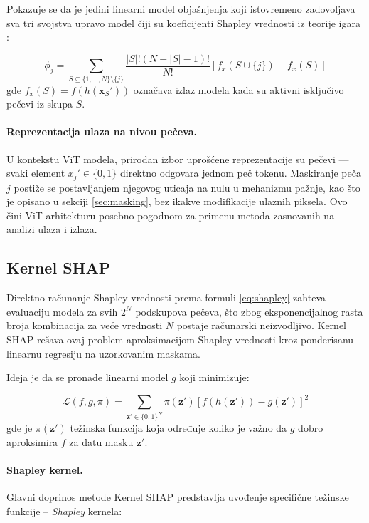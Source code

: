 Pokazuje se da je jedini linearni model objašnjenja koji 
istovremeno zadovoljava sva tri svojstva upravo model čiji su koeficijenti Shapley vrednosti iz teorije igara \cite{lundberg2017shap}:

\begin{equation}
    \phi_j = \sum_{S \subseteq \{1,\ldots,N\} \setminus \{j\}} 
    \frac{|S|!(N-|S|-1)!}{N!} 
    \left[ f_x(S \cup \{j\}) - f_x(S) \right]
    \label{eq:shapley}
\end{equation}
gde $f_x(S) = f(h(\mathbf{x}_S'))$ označava izlaz modela kada su aktivni 
isključivo pečevi iz skupa $S$.

\paragraph{Reprezentacija ulaza na nivou pečeva.} U kontekstu ViT modela, 
prirodan izbor uprošćene reprezentacije su pečevi — svaki element 
$x_j' \in \{0,1\}$ direktno odgovara jednom peč tokenu. Maskiranje peča 
$j$ postiže se postavljanjem njegovog uticaja na nulu u mehanizmu pažnje, 
kao što je opisano u sekciji \ref{sec:masking}, bez ikakve modifikacije 
ulaznih piksela. Ovo čini ViT arhitekturu posebno pogodnom za primenu 
metoda zasnovanih na analizi ulaza i izlaza.

\subsection{Kernel SHAP}

Direktno računanje Shapley vrednosti prema formuli \eqref{eq:shapley} zahteva 
evaluaciju modela za svih $2^N$ podskupova pečeva, što zbog eksponencijalnog rasta broja kombinacija za veće vrednosti $N$ postaje računarski neizvodljivo. Kernel SHAP \cite{lundberg2017shap} rešava ovaj 
problem aproksimacijom Shapley vrednosti kroz ponderisanu linearnu regresiju 
na uzorkovanim maskama.

Ideja je da se pronađe linearni model $g$ koji minimizuje:

\begin{equation}
    \mathcal{L}(f, g, \pi) = \sum_{\mathbf{z}' \in \{0,1\}^N} 
    \pi(\mathbf{z}') \left[ f(h(\mathbf{z}')) - g(\mathbf{z}') \right]^2
    \label{eq:kernel_loss}
\end{equation}
gde je $\pi(\mathbf{z}')$ težinska funkcija koja određuje koliko je važno 
da $g$ dobro aproksimira $f$ za datu masku $\mathbf{z}'$.

\paragraph{Shapley kernel.} Glavni doprinos metode Kernel SHAP predstavlja uvođenje specifične težinske funkcije -- \textit{Shapley} kernela:

